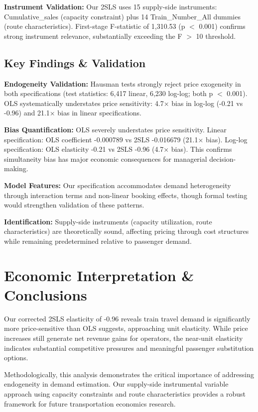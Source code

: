 \documentclass[12pt]{article}
\begin{document}
\textbf{Instrument Validation:} Our 2SLS uses 15 supply-side instruments: Cumulative\_sales (capacity constraint) plus 14 Train\_Number\_All dummies (route characteristics). First-stage F-statistic of 1,310.53 (p $<$ 0.001) confirms strong instrument relevance, substantially exceeding the F $>$ 10 threshold.

\subsection{Key Findings \& Validation}

\textbf{Endogeneity Validation:} Hausman tests strongly reject price exogeneity in both specifications (test statistics: 6,417 linear, 6,230 log-log; both p $<$ 0.001). OLS systematically understates price sensitivity: 4.7× bias in log-log (-0.21 vs -0.96) and 21.1× bias in linear specifications.

\textbf{Bias Quantification:} OLS severely understates price sensitivity. Linear specification: OLS coefficient -0.000789 vs 2SLS -0.016679 (21.1× bias). Log-log specification: OLS elasticity -0.21 vs 2SLS -0.96 (4.7× bias). This confirms simultaneity bias has major economic consequences for managerial decision-making.

\textbf{Model Features:} Our specification accommodates demand heterogeneity through interaction terms and non-linear booking effects, though formal testing would strengthen validation of these patterns.

\textbf{Identification:} Supply-side instruments (capacity utilization, route characteristics) are theoretically sound, affecting pricing through cost structures while remaining predetermined relative to passenger demand.

\section{Economic Interpretation \& Conclusions}

Our corrected 2SLS elasticity of -0.96 reveals train travel demand is significantly more price-sensitive than OLS suggests, approaching unit elasticity. While price increases still generate net revenue gains for operators, the near-unit elasticity indicates substantial competitive pressures and meaningful passenger substitution options.

Methodologically, this analysis demonstrates the critical importance of addressing endogeneity in demand estimation. Our supply-side instrumental variable approach using capacity constraints and route characteristics provides a robust framework for future transportation economics research.
\end{document}
